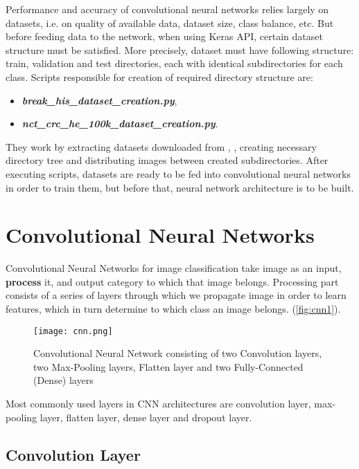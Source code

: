 Performance and accuracy of convolutional neural networks relies largely on datasets, i.e. on quality of available data, dataset size, class balance, etc. But before feeding data to the network, when using Keras API, certain dataset structure must be satisfied. More precisely, dataset must have following structure: train, validation and test directories, each with identical subdirectories for each class. Scripts responsible for creation of required directory structure are:
\begin{itemize}
	\itemsep 0em
	\item \emph{\textbf{break\_his\_dataset\_creation.py}},
	\item \emph{\textbf{nct\_crc\_he\_100k\_dataset\_creation.py}}.
\end{itemize} 
They work by extracting datasets downloaded from \cite{breakhis_bib}, \cite{nctcrche100k_bib}, creating necessary directory tree and distributing images between created subdirectories. After executing scripts, datasets are ready to be fed into convolutional neural networks in order to train them, but before that, neural network architecture is to be built.
\clearpage

\section{Convolutional Neural Networks} \label{cnn}

Convolutional Neural Networks for image classification take image as an input, \textbf{process} it, and output category to which that image belongs. Processing part consists of a series of layers through which we propagate image in order to learn features, which in turn determine to which class an image belongs. (\textcolor{red}{\autoref{fig:cnn1}}).

\begin{figure}[h]
	\centering
	\texttt{[image: cnn.png]}
	\caption{Convolutional Neural Network consisting of two Convolution layers, two Max-Pooling layers, Flatten layer and two Fully-Connected (Dense) layers}
	\label{fig:cnn1}
\end{figure}

Most commonly used layers in CNN architectures are convolution layer, max-pooling layer, flatten layer, dense layer and dropout layer.

\subsection{Convolution Layer}

